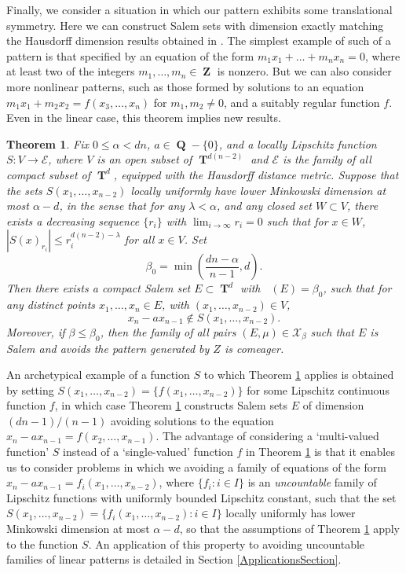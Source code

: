 \documentclass[dvipsnames,letterpaper,12pt]{article}
\numberwithin{equation}{section}
\DeclareMathOperator{\fordim}{\dim_{\mathbf{F}}}
\DeclareMathOperator{\ZZ}{\mathbf{Z}}
\DeclareMathOperator{\QQ}{\mathbf{Q}}
\DeclareMathOperator{\TT}{\mathbf{T}}
\newtheorem{theorem}{Theorem}
\numberwithin{theorem}{section}
\begin{document}
Finally, we consider a situation in which our pattern exhibits some translational symmetry. Here we can construct Salem sets with dimension exactly matching the Hausdorff dimension results obtained in \cite{OurPaper}. The simplest example of such of a pattern is that specified by an equation of the form $m_1x_1 + \dots + m_nx_n = 0$, where at least two of the integers $m_1,\dots,m_n \in \ZZ$ is nonzero. But we can also consider more nonlinear patterns, such as those formed by solutions to an equation $m_1x_1 + m_2x_2 = f(x_3,\dots,x_n)$ for $m_1,m_2 \neq 0$, and a suitably regular function $f$. Even in the linear case, this theorem implies new results.

\begin{theorem} \label{thirdTheorem}
    Fix $0 \leq \alpha < dn$, $a \in \QQ - \{ 0 \}$, and a locally Lipschitz function $S: V \to \mathcal{E}$, where $V$ is an open subset of $\TT^{d(n-2)}$ and $\mathcal{E}$ is the family of all compact subset of $\TT^d$, equipped with the Hausdorff distance metric. Suppose that the sets $S(x_1,\dots,x_{n-2})$ \emph{locally uniformly} have lower Minkowski dimension at most $\alpha - d$, in the sense that for any $\lambda < \alpha$, and any closed set $W \subset V$, there exists a decreasing sequence $\{ r_i \}$ with $\lim_{i \to \infty} r_i = 0$ such that for $x \in W$, $|S(x)_{r_i}| \leq r_i^{d(n-2)-\lambda}$ for all $x \in V$. Set
    \[ \beta_0 = \min \left( \frac{dn - \alpha}{n-1}, d \right). \]
    Then there exists a compact Salem set $E \subset \TT^d$ with $\fordim(E) = \beta_0$, such that for any distinct points $x_1,\dots,x_n \in E$, with $(x_1,\dots,x_{n-2}) \in V$,
    \[ x_n - a x_{n-1} \not \in S(x_1,\dots,x_{n-2}). \]
    Moreover, if $\beta \leq \beta_0$, then the family of all pairs $(E,\mu) \in \mathcal{X}_\beta$ such that $E$ is Salem and avoids the pattern generated by $Z$ is comeager.
\end{theorem}

An archetypical example of a function $S$ to which Theorem \ref{thirdTheorem} applies is obtained by setting $S(x_1,\dots,x_{n-2}) = \{ f(x_1,\dots,x_{n-2}) \}$ for some Lipschitz continuous function $f$, in which case Theorem \ref{thirdTheorem} constructs Salem sets $E$ of dimension $(dn-1)/(n-1)$ avoiding solutions to the equation $x_n - a x_{n-1} = f(x_2,\dots,x_{n-1})$. The advantage of considering a `multi-valued function' $S$ instead of a `single-valued' function $f$ in Theorem \ref{thirdTheorem} is that it enables us to consider problems in which we avoiding a family of equations of the form $x_n - ax_{n-1} = f_i(x_1,\dots,x_{n-2})$, where $\{ f_i : i \in I \}$ is an \emph{uncountable} family of Lipschitz functions with uniformly bounded Lipschitz constant, such that the set $S(x_1,\dots,x_{n-2}) = \{ f_i(x_1,\dots,x_{n-2}) : i \in I \}$ locally uniformly has lower Minkowski dimension at most $\alpha - d$, so that the assumptions of Theorem \ref{thirdTheorem} apply to the function $S$. An application of this property to avoiding uncountable families of linear patterns is detailed in Section \ref{ApplicationsSection}. 
\end{document}
